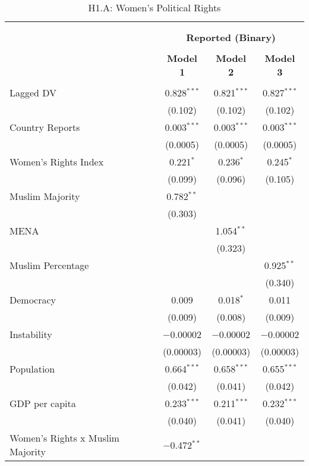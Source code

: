 
\begin{table}[!htbp] \centering 
  \caption{H1.A: Women's Political Rights} 
  \label{} 
\begin{tabular}{@{\extracolsep{5pt}}lccc} 
\\[-1.8ex]\hline \\[-1.8ex] 
\\[-1.8ex] & \multicolumn{3}{c}{\textbf{Reported (Binary)}} \\ 
\\[-1.8ex] & \textbf{Model 1} & \textbf{Model 2} & \textbf{Model 3}\\ 
\hline \\[-1.8ex] 
 Lagged DV & 0.828$^{***}$ & 0.821$^{***}$ & 0.827$^{***}$ \\ 
  & (0.102) & (0.102) & (0.102) \\ 
  Country Reports & 0.003$^{***}$ & 0.003$^{***}$ & 0.003$^{***}$ \\ 
  & (0.0005) & (0.0005) & (0.0005) \\ 
  Women's Rights Index & 0.221$^{*}$ & 0.236$^{*}$ & 0.245$^{*}$ \\ 
  & (0.099) & (0.096) & (0.105) \\ 
  Muslim Majority & 0.782$^{**}$ &  &  \\ 
  & (0.303) &  &  \\ 
  MENA &  & 1.054$^{**}$ &  \\ 
  &  & (0.323) &  \\ 
  Muslim Percentage &  &  & 0.925$^{**}$ \\ 
  &  &  & (0.340) \\ 
  Democracy & 0.009 & 0.018$^{*}$ & 0.011 \\ 
  & (0.009) & (0.008) & (0.009) \\ 
  Instability & $-$0.00002 & $-$0.00002 & $-$0.00002 \\ 
  & (0.00003) & (0.00003) & (0.00003) \\ 
  Population & 0.664$^{***}$ & 0.658$^{***}$ & 0.655$^{***}$ \\ 
  & (0.042) & (0.041) & (0.042) \\ 
  GDP per capita & 0.233$^{***}$ & 0.211$^{***}$ & 0.232$^{***}$ \\ 
  & (0.040) & (0.041) & (0.040) \\ 
  Women's Rights x Muslim Majority & $-$0.472$^{**}$ &  &  \\ 

\end{tabular}
\end{table}
